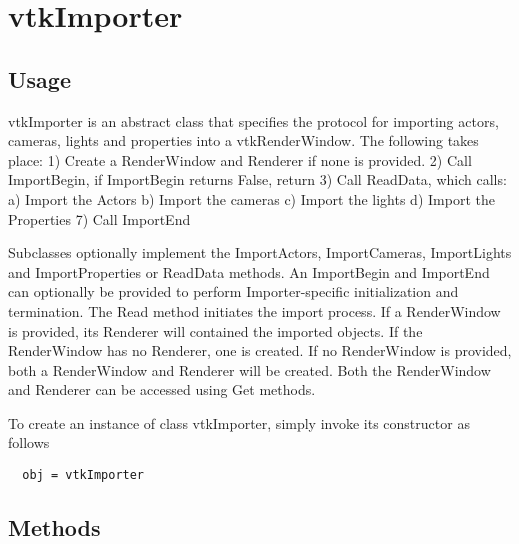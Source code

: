 \section{vtkImporter}

\subsection{Usage}

 vtkImporter is an abstract class that specifies the protocol for
 importing actors, cameras, lights and properties into a
 vtkRenderWindow. The following takes place:
 1) Create a RenderWindow and Renderer if none is provided.
 2) Call ImportBegin, if ImportBegin returns False, return
 3) Call ReadData, which calls:
  a) Import the Actors
  b) Import the cameras
  c) Import the lights
  d) Import the Properties
 7) Call ImportEnd

 Subclasses optionally implement the ImportActors, ImportCameras,
 ImportLights and ImportProperties or ReadData methods. An ImportBegin and
 ImportEnd can optionally be provided to perform Importer-specific
 initialization and termination.  The Read method initiates the import
 process. If a RenderWindow is provided, its Renderer will contained
 the imported objects. If the RenderWindow has no Renderer, one is
 created. If no RenderWindow is provided, both a RenderWindow and
 Renderer will be created. Both the RenderWindow and Renderer can be
 accessed using Get methods.

To create an instance of class vtkImporter, simply
invoke its constructor as follows
\begin{verbatim}
  obj = vtkImporter
\end{verbatim}
\subsection{Methods}

